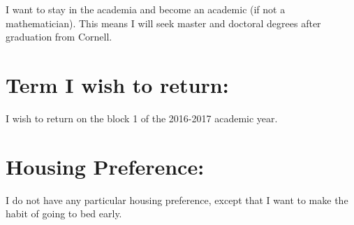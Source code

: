 	I want to stay in the academia and become an academic (if not a mathematician).
	This means I will seek master and doctoral degrees after graduation from
	Cornell.
	
	\section*{Term I wish to return:}
	I wish to return on the block 1 of the 2016-2017 academic year.
	
	\section*{Housing Preference:}
	I do not have any particular housing preference, except that I want to make the
	habit of going to bed early.
	
	\nocite{*}
	
	\clearpage
	
	\printbibliography
